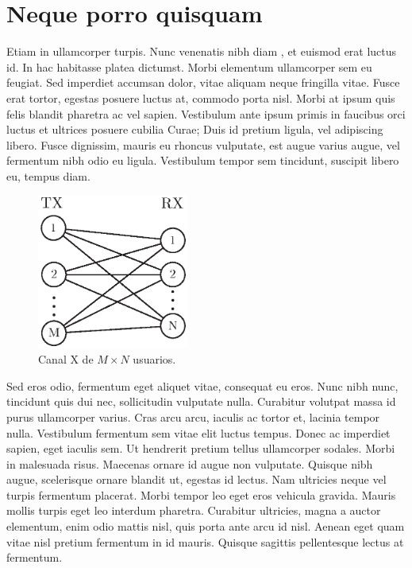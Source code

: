 ﻿\chapter{Neque porro quisquam}

Etiam in ullamcorper turpis. Nunc venenatis nibh diam \cite{doe2016}, et euismod erat luctus id. In hac habitasse platea dictumst. Morbi elementum ullamcorper sem eu feugiat. Sed imperdiet accumsan dolor, vitae aliquam neque fringilla vitae. Fusce erat tortor, egestas posuere luctus at, commodo porta nisl. Morbi at ipsum quis felis blandit pharetra ac vel sapien. Vestibulum ante ipsum primis in faucibus orci luctus et ultrices posuere cubilia Curae; Duis id pretium ligula, vel adipiscing libero. Fusce dignissim, mauris eu rhoncus vulputate, est augue varius augue, vel fermentum nibh odio eu ligula. Vestibulum tempor sem tincidunt, suscipit libero eu, tempus diam.

\begin{figure}[h!]
    \begin{center}
        \includegraphics[width=5cm]{content/fig/chap1/X_channel_MxN.eps}
    \end{center}
   \caption{Canal X de $M\times N$ usuarios.}
  \label{fig:X_channel_MxN}
\end{figure}

Sed eros odio, fermentum eget aliquet vitae, consequat eu eros. Nunc nibh nunc, tincidunt quis dui nec, sollicitudin vulputate nulla. Curabitur volutpat massa id purus ullamcorper varius. Cras arcu arcu, iaculis ac tortor et, lacinia tempor nulla. Vestibulum fermentum sem vitae elit luctus tempus. Donec ac imperdiet sapien, eget iaculis sem. Ut hendrerit pretium tellus ullamcorper sodales. Morbi in malesuada risus. Maecenas ornare id augue non vulputate. Quisque nibh augue, scelerisque ornare blandit ut, egestas id lectus. Nam ultricies neque vel turpis fermentum placerat. Morbi tempor leo eget eros vehicula gravida. Mauris mollis turpis eget leo interdum pharetra. Curabitur ultricies, magna a auctor elementum, enim odio mattis nisl, quis porta ante arcu id nisl. Aenean eget quam vitae nisl pretium fermentum in id mauris. Quisque sagittis pellentesque lectus at fermentum.

